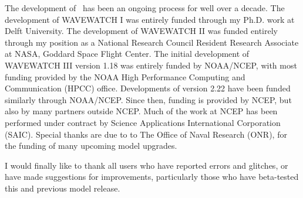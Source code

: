 The development of \ws\ has been an ongoing process for well over a
decade. The development of WAVEWATCH I was entirely funded through my
Ph.D. work at Delft University. The development of WAVEWATCH II was
funded entirely through my position as a National Research Council Resident
Research Associate at NASA, Goddard Space Flight Center. The initial
development of WAVEWATCH III version 1.18 was entirely funded by NOAA/NCEP,
with most funding provided by the NOAA High Performance Computing and
Communication (HPCC) office. Developments of version 2.22 have been funded
similarly through NOAA/NCEP. Since then, funding is provided by NCEP, but also
by many partners outside NCEP. Much of the work at NCEP has been performed
under contract by Science Applications International Corporation (SAIC).
Special thanks are due to to The Office of Naval Research (ONR), for the
funding of many upcoming model upgrades.

I would finally like to thank all users who have reported errors and glitches,
or have made suggestions for improvements, particularly those who have
beta-tested this and previous model release.

